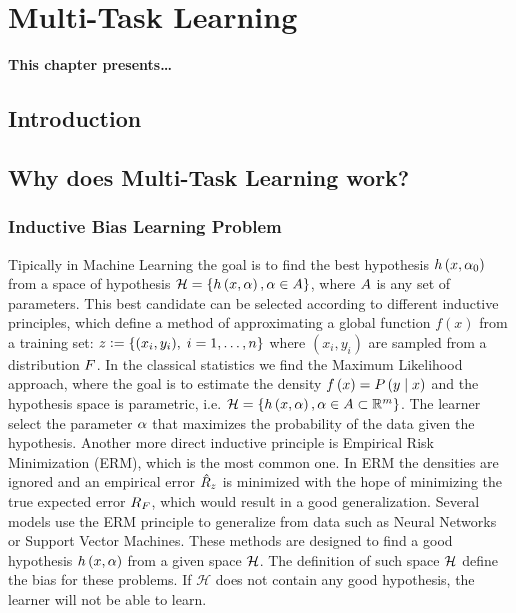 
\chapter{Multi-Task Learning} %
\label{Chapter2}

{\bf \small{
This chapter presents\dots
}}

\section{Introduction}



\section{Why does Multi-Task Learning work?}
% 
\subsection{Inductive Bias Learning Problem} %
Tipically in Machine Learning the goal is to find the best hypothesis $h\left(x, \alpha_0\right)$ from a space of hypothesis $\mathcal{H} = \left\{h\left(x, \alpha\right), \alpha \in A\right\}$, where $A$ is any set of parameters. This best candidate can be selected according to different inductive principles, which define a method of approximating a global function $f(x)$ from a training set:
$ z \vcentcolon= \left\{(x_i, y_i),\; i=1, \ldots, n\right\} $
where $(x_i, y_i)$ are sampled from a distribution $F$.
%
In the classical statistics we find the Maximum Likelihood approach, where the goal is to estimate the density $f\left(x\right) = P\left( y \;\middle\vert\; x \right)$ and the hypothesis space is parametric, i.e. $\mathcal{H} = \left\{h\left(x, \alpha\right), \alpha \in A \subset \mathbb{R}^m\right\}$. The learner select the parameter $\alpha$ that maximizes the probability of the data given the hypothesis.
%
Another more direct inductive principle is Empirical Risk Minimization (ERM), which is the most common one. In ERM the densities are ignored and an empirical error $\hat{R}_z$ is minimized with the hope of minimizing the true expected error $R_F$, which would result in a good generalization. 
%
Several models use the ERM principle to generalize from data such as Neural Networks or Support Vector Machines. These methods are designed to find a good hypothesis $h\left(x, \alpha\right)$ from a given space $\mathcal{H}$. The definition of such space $\mathcal{H}$ define the bias for these problems. If $\mathcal{H}$ does not contain any good hypothesis, the learner will not be able to learn.
%

